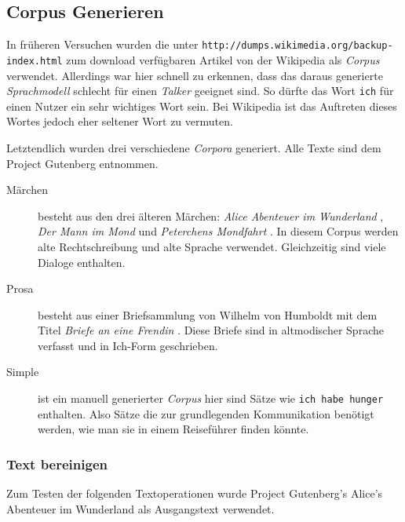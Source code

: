 \subsection{Corpus Generieren}
    In früheren Versuchen wurden die unter \texttt{http://dumps.wikimedia.org/backup-index.html} zum download verfügbaren Artikel von der Wikipedia als \emph{Corpus} verwendet. Allerdings war hier schnell zu erkennen, dass das daraus generierte \emph{Sprachmodell} schlecht für einen \emph{Talker} geeignet sind. So dürfte das Wort \texttt{ich} für einen Nutzer ein sehr wichtiges Wort sein. Bei Wikipedia ist das Auftreten dieses Wortes jedoch eher seltener Wort zu vermuten.
    
    Letztendlich wurden drei verschiedene \emph{Corpora} generiert.
    Alle Texte sind dem Project Gutenberg entnommen.
    
    \begin{description}
		\item[Märchen] besteht aus den drei älteren Märchen: \emph{Alice Abenteuer im Wunderland} \parencite{gutenberg:alice}, \emph{Der Mann im Mond} \parencite{gutenberg:mannImMond} und \emph{Peterchens Mondfahrt} \parencite{gutenberg:mondfahrt}. In diesem Corpus werden alte Rechtschreibung und alte Sprache verwendet. Gleichzeitig sind viele Dialoge enthalten.
        
        \item[Prosa] besteht aus einer Briefsammlung von Wilhelm von Humboldt mit dem Titel \emph{Briefe an eine Frendin} \parencite{gutenberg:briefeFreundin}. Diese Briefe sind in altmodischer Sprache verfasst und in Ich-Form geschrieben.
        
        \item[Simple] ist ein manuell generierter \emph{Corpus} hier sind Sätze wie \texttt{ich habe hunger} enthalten. Also Sätze die zur grundlegenden Kommunikation benötigt werden, wie man sie in einem Reiseführer finden könnte.
            
	\end{description}
        
    \subsubsection*{Text bereinigen}
    
        Zum Testen der folgenden Textoperationen wurde Project Gutenberg's Alice's Abenteuer im Wunderland \parencite{gutenberg:alice} als Ausgangstext verwendet.
        
